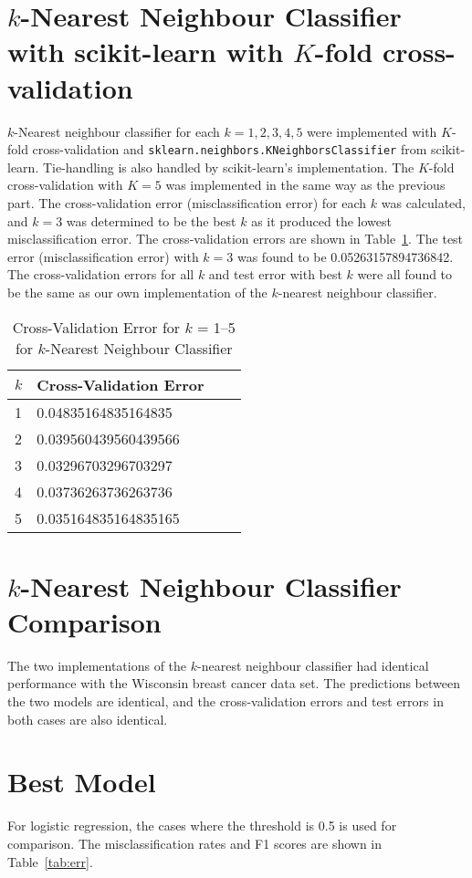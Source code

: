 \documentclass[12pt]{article}
\begin{document}
\section*{$k$-Nearest Neighbour Classifier with scikit-learn with $K$-fold cross-validation}
$k$-Nearest neighbour classifier for each $k = 1,2,3,4,5$ were implemented with $K$-fold cross-validation and \texttt{sklearn.neighbors.KNeighborsClassifier} from scikit-learn. Tie-handling is also handled by scikit-learn's implementation. The $K$-fold cross-validation with $K = 5$ was implemented in the same way as the previous part. The cross-validation error (misclassification error) for each $k$ was calculated, and $k = 3$ was determined to be the best $k$ as it produced the lowest misclassification error. The cross-validation errors are shown in Table~\ref{tab:kneigh_scikit}. The test error (misclassification error) with $k = 3$ was found to be 0.05263157894736842. The cross-validation errors for all $k$ and test error with best $k$ were all found to be the same as our own implementation of the $k$-nearest neighbour classifier.

\begin{table}[htp]
\centering
\caption{Cross-Validation Error for $k$ = 1--5 for $k$-Nearest Neighbour Classifier}\label{tab:kneigh_scikit}
\begin{tabular}{|l|l|l|l|}
	\hline
	$k$	& Cross-Validation Error	\\ \hline\hline
	1  	& 0.04835164835164835		\\ \hline
	2  	& 0.039560439560439566		\\ \hline
	3  	& 0.03296703296703297		\\ \hline
	4  	& 0.03736263736263736		\\ \hline
	5  	& 0.035164835164835165		\\ \hline
\end{tabular}
\end{table}

\section*{$k$-Nearest Neighbour Classifier Comparison}
The two implementations of the $k$-nearest neighbour classifier had identical performance with the Wisconsin breast cancer data set. The predictions between the two models are identical, and the cross-validation errors and test errors in both cases are also identical.

\section*{Best Model}
For logistic regression, the cases where the threshold is 0.5 is used for comparison. The misclassification rates and F1 scores are shown in Table~\ref{tab:err}.
\end{document}
